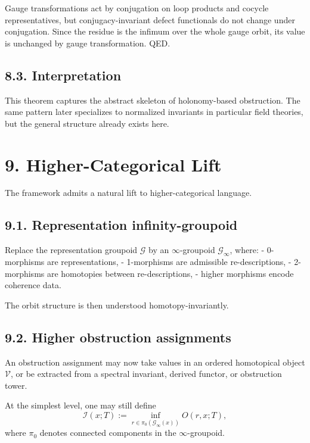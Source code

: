 \documentclass[
]{article}
\begin{document}
Gauge transformations act by conjugation on loop products and cocycle
representatives, but conjugacy-invariant defect functionals do not
change under conjugation. Since the residue is the infimum over the
whole gauge orbit, its value is unchanged by gauge transformation. QED.

\subsection{8.3. Interpretation}\label{interpretation-1}

This theorem captures the abstract skeleton of holonomy-based
obstruction. The same pattern later specializes to normalized invariants
in particular field theories, but the general structure already exists
here.

\section{9. Higher-Categorical Lift}\label{higher-categorical-lift}

The framework admits a natural lift to higher-categorical language.

\subsection{9.1. Representation
infinity-groupoid}\label{representation-infinity-groupoid}

Replace the representation groupoid \(\mathcal{G}\) by an
\(\infty\)-groupoid \(\mathcal{G}_\infty\), where: - 0-morphisms are
representations, - 1-morphisms are admissible re-descriptions, -
2-morphisms are homotopies between re-descriptions, - higher morphisms
encode coherence data.

The orbit structure is then understood homotopy-invariantly.

\subsection{9.2. Higher obstruction
assignments}\label{higher-obstruction-assignments}

An obstruction assignment may now take values in an ordered homotopical
object \(\mathcal{V}\), or be extracted from a spectral invariant,
derived functor, or obstruction tower.

At the simplest level, one may still define \[
\mathcal{I}(x;T) := \inf_{r \in \pi_0(\mathcal{G}_\infty(x))} O(r,x;T),
\] where \(\pi_0\) denotes connected components in the
\(\infty\)-groupoid.
\end{document}

